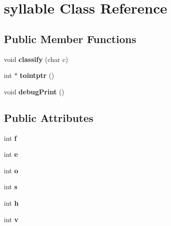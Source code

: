 \hypertarget{classsyllable}{\section{syllable Class Reference}
\label{classsyllable}
}
\subsection*{Public Member Functions}
\begin{DoxyCompactItemize}
\item 
\hypertarget{classsyllable_ac96f3746c2809f61641bbd84d8a54d6c}{void {\bfseries classify} (char c)}\label{classsyllable_ac96f3746c2809f61641bbd84d8a54d6c}

\item 
\hypertarget{classsyllable_a0098736a4e24ef25f99f5931f557f9be}{int $\ast$ {\bfseries tointptr} ()}\label{classsyllable_a0098736a4e24ef25f99f5931f557f9be}

\item 
\hypertarget{classsyllable_a541d6d839787682f075fee01a498b511}{void {\bfseries debug\-Print} ()}\label{classsyllable_a541d6d839787682f075fee01a498b511}

\end{DoxyCompactItemize}
\subsection*{Public Attributes}
\begin{DoxyCompactItemize}
\item 
\hypertarget{classsyllable_ae3fda13a6215b399041e95de95a04033}{int {\bfseries f}}\label{classsyllable_ae3fda13a6215b399041e95de95a04033}

\item 
\hypertarget{classsyllable_ad9f67cc4fde291811160b7b0d550828a}{int {\bfseries e}}\label{classsyllable_ad9f67cc4fde291811160b7b0d550828a}

\item 
\hypertarget{classsyllable_a866c1da80432c27b617e828b10555bf2}{int {\bfseries o}}\label{classsyllable_a866c1da80432c27b617e828b10555bf2}

\item 
\hypertarget{classsyllable_a187ccc69a6a8c75c0d3b8eef2df058e8}{int {\bfseries s}}\label{classsyllable_a187ccc69a6a8c75c0d3b8eef2df058e8}

\item 
\hypertarget{classsyllable_a2b09344ec090d843ffea4f9ab766d904}{int {\bfseries h}}\label{classsyllable_a2b09344ec090d843ffea4f9ab766d904}

\item 
\hypertarget{classsyllable_a4cec2f8c6bee7e16ec7071ed630f0c33}{int {\bfseries v}}\label{classsyllable_a4cec2f8c6bee7e16ec7071ed630f0c33}

\end{DoxyCompactItemize}


